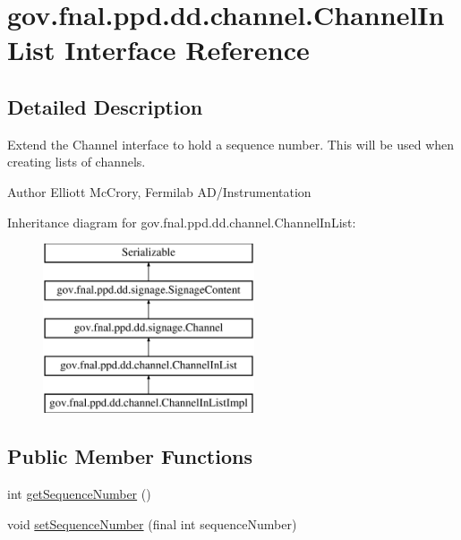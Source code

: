 \hypertarget{interfacegov_1_1fnal_1_1ppd_1_1dd_1_1channel_1_1ChannelInList}{\section{gov.\-fnal.\-ppd.\-dd.\-channel.\-Channel\-In\-List Interface Reference}
\label{interfacegov_1_1fnal_1_1ppd_1_1dd_1_1channel_1_1ChannelInList}
}


\subsection{Detailed Description}
Extend the Channel interface to hold a sequence number. This will be used when creating lists of channels.

\begin{DoxyAuthor}{Author}
Elliott Mc\-Crory, Fermilab A\-D/\-Instrumentation 
\end{DoxyAuthor}
Inheritance diagram for gov.\-fnal.\-ppd.\-dd.\-channel.\-Channel\-In\-List\-:\begin{figure}[H]
\begin{center}
\leavevmode
\includegraphics[height=5.000000cm]{interfacegov_1_1fnal_1_1ppd_1_1dd_1_1channel_1_1ChannelInList}
\end{center}
\end{figure}
\subsection*{Public Member Functions}
\begin{DoxyCompactItemize}
\item 
int \hyperlink{interfacegov_1_1fnal_1_1ppd_1_1dd_1_1channel_1_1ChannelInList_a73b9620309ba3f2e8cd7142e9f107227}{get\-Sequence\-Number} ()
\item 
void \hyperlink{interfacegov_1_1fnal_1_1ppd_1_1dd_1_1channel_1_1ChannelInList_a248382f22bfd71369082af07784e0fff}{set\-Sequence\-Number} (final int sequence\-Number)
\end{DoxyCompactItemize}


